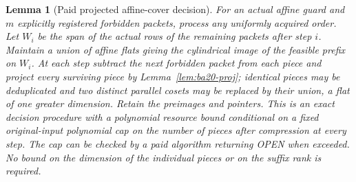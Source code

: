 \documentclass[11pt]{article}
\newtheorem{lemma}[theorem]{Lemma}
\begin{document}
\begin{lemma}[Paid projected affine-cover decision]\label{lem:ba20-consume}
For an actual affine guard and $m$ explicitly registered forbidden packets, process any uniformly acquired order. Let $W_i$ be the span of the actual rows of the remaining packets after step $i$. Maintain a union of affine flats giving the cylindrical image of the feasible prefix on $W_i$. At each step subtract the next forbidden packet from each piece and project every surviving piece by Lemma~\ref{lem:ba20-proj}; identical pieces may be deduplicated and two distinct parallel cosets may be replaced by their union, a flat of one greater dimension. Retain the preimages and pointers. This is an exact decision procedure with a polynomial resource bound conditional on a fixed original-input polynomial cap on the number of pieces after compression at every step. The cap can be checked by a paid algorithm returning OPEN when exceeded. No bound on the dimension of the individual pieces or on the suffix rank is required.
\end{lemma}
\end{document}
